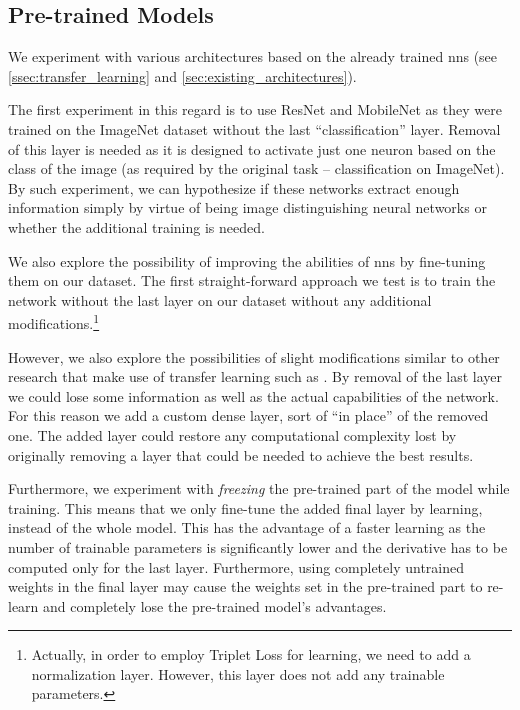 \subsection{Pre-trained Models}

\label{ssec:pretrained_models}

We experiment with various architectures based on the already trained \glspl{nn} (see \autoref{ssec:transfer_learning} and \autoref{sec:existing_architectures}).

The first experiment in this regard is to use ResNet and MobileNet as they were trained on the ImageNet dataset without the last ``classification'' layer. Removal of this layer is needed as it is designed to activate just one neuron based on the class of the image (as required by the original task -- classification on ImageNet). By such experiment, we can hypothesize if these networks extract enough information simply by virtue of being image distinguishing neural networks or whether the additional training is needed.

We also explore the possibility of improving the abilities of \glspl{nn} by fine-tuning them on our dataset. The first straight-forward approach we test is to train the network without the last layer on our dataset without any additional modifications.\footnote{Actually, in order to employ Triplet Loss for learning, we need to add a normalization layer. However, this layer does not add any trainable parameters.}

However, we also explore the possibilities of slight modifications similar to other research that make use of transfer learning such as \cite{tajbakhsh2016convolutional}. By removal of the last layer we could lose some information as well as the actual capabilities of the network. For this reason we add a custom dense layer, sort of ``in place'' of the removed one. The added layer could restore any computational complexity lost by originally removing a layer that could be needed to achieve the best results.

Furthermore, we experiment with \emph{freezing} the pre-trained part of the model while training. This means that we only fine-tune the added final layer by learning, instead of the whole model. This has the advantage of a faster learning as the number of trainable parameters is significantly lower and the derivative has to be computed only for the last layer. Furthermore, using completely untrained weights in the final layer may cause the weights set in the pre-trained part to re-learn and completely lose the pre-trained model's advantages.

